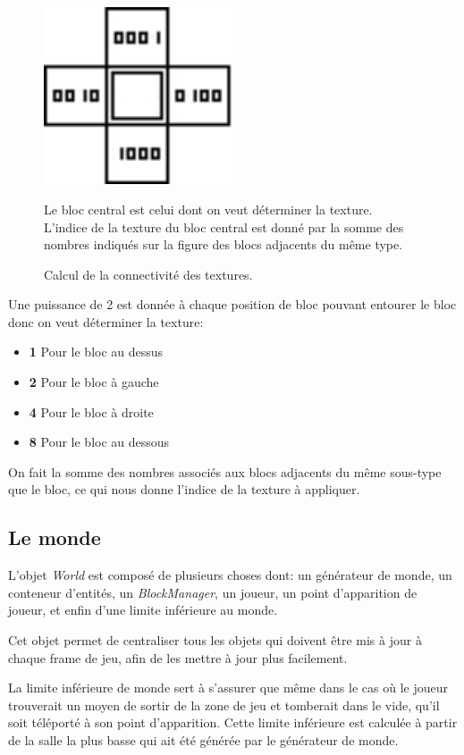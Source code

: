 \documentclass[10pt]{report}
\begin{document}
\begin{figure}[H]
  \centering
  \includegraphics[width=0.5\textwidth]{images/connected_textures_offset_computing}
  \caption{Calcul de la connectivité des textures.}
  Le bloc central est celui dont on veut déterminer la texture.\\
  L'indice de la texture du bloc central est donné par la somme des nombres indiqués sur la figure des blocs adjacents du même type.
  \label{fig:connected_textures_computing}
\end{figure}

Une puissance de 2 est donnée à chaque position de bloc pouvant entourer le bloc donc on veut déterminer la texture:
\begin{itemize}
  \item \textbf{1} Pour le bloc au dessus
  \item \textbf{2} Pour le bloc à gauche
  \item \textbf{4} Pour le bloc à droite
  \item \textbf{8} Pour le bloc au dessous
\end{itemize}
On fait la somme des nombres associés aux blocs adjacents du même sous-type que le bloc, ce qui nous donne l'indice de la texture à appliquer.

\subsection{Le monde}

L'objet \emph{World} est composé de plusieurs choses dont: un générateur de monde, un conteneur d'entités,
un \emph{BlockManager}, un joueur, un point d'apparition de joueur, et enfin d'une limite inférieure au monde.

Cet objet permet de centraliser tous les objets qui doivent être mis à jour à chaque frame de jeu, afin de
les mettre à jour plus facilement.

La limite inférieure de monde sert à s'assurer que même dans le cas où le joueur trouverait un moyen de sortir de la
zone de jeu et tomberait dans le vide, qu'il soit téléporté à son point d'apparition.
Cette limite inférieure est calculée à partir de la salle la plus basse qui ait été générée par le générateur de monde.
\end{document}

